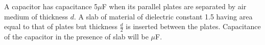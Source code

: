 \item A capacitor has capacitance 5$\mu$F when its parallel plates are separated by air medium of thickness $d$. A slab of material of dielectric constant 1.5 having area equal to that of plates but thickness $\frac{d}{2}$ is inserted between the plates. Capacitance of the capacitor in the presence of slab will be \underline{\hspace{2.5cm}}$\mu$F.